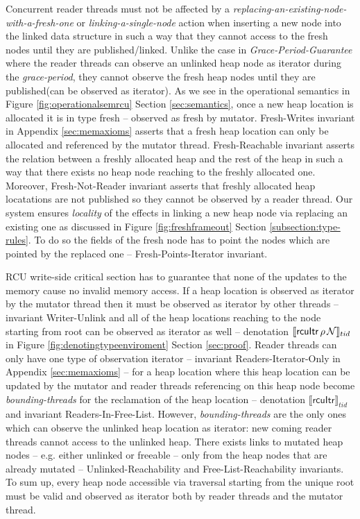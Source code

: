  Concurrent reader threads must not be affected by a \textit{replacing-an-existing-node-with-a-fresh-one} or \textit{linking-a-single-node} action when inserting a new node into the linked data structure in such a way that they cannot access to the fresh nodes until they are published/linked. Unlike the case in \textit{Grace-Period-Guarantee} where the reader threads can observe an unlinked heap node as \textsf{iterator} during the \textit{grace-period}, they cannot observe the fresh heap nodes until they are published(can be observed as \textsf{iterator}). As we see in the operational semantics in Figure \ref{fig:operationalsemrcu} Section \ref{sec:semantics}, once a new heap location is allocated it is in type \textsf{fresh} -- observed as \textsf{fresh} by mutator. \textsf{Fresh-Writes} invariant in Appendix \ref{sec:memaxioms} asserts that a fresh heap location can only be allocated and referenced by the mutator thread. \textsf{Fresh-Reachable} invariant asserts the relation between a freshly allocated heap and the rest of the heap in such a way that there exists no heap node reaching to the freshly allocated one. Moreover, \textsf{Fresh-Not-Reader} invariant asserts that freshly allocated heap locatations are not published so they cannot be observed by a reader thread. Our system ensures \textit{locality} of the effects in linking a new heap node via replacing an existing one as discussed in Figure \ref{fig:freshframeout} Section \ref{subsection:type-rules}. To do so the fields of the fresh node has to point the nodes which are pointed by the replaced one -- \textsf{Fresh-Points-Iterator} invariant.

 RCU write-side critical section has to guarantee that none of the updates to the memory cause no invalid memory access. If a heap location is observed as \textsf{iterator} by the mutator thread then it must be observed as \textsf{iterator} by other threads -- invariant \textsf{Writer-Unlink} and all of the heap locations reaching to the node starting from root can be observed as \textsf{iterator} as well -- denotation $\llbracket \mathsf{rcuItr}\,\rho \,\mathcal{N} \rrbracket_{tid}$ in Figure \ref{fig:denotingtypeenviroment} Section \ref{sec:proof}. Reader threads can only have one type of observation \textsf{iterator} -- invariant \textsf{Readers-Iterator-Only} in Appendix \ref{sec:memaxioms} -- for a heap location where this heap location can be updated by the mutator and reader threads referencing on this heap node become \textit{bounding-threads} for the reclamation of the heap location -- denotation $\llbracket \mathsf{rcuItr} \rrbracket_{tid}$ and invariant \textsf{Readers-In-Free-List}. However, \textit{bounding-threads} are the only ones which can observe the \textsf{unlinked} heap location as \textsf{iterator}: new coming reader threads cannot access to the \textsf{unlinked} heap. There exists links to mutated heap nodes -- e.g. either \textsf{unlinked} or \textsf{freeable} -- only from the heap nodes that are already mutated -- \textsf{Unlinked-Reachability} and \textsf{Free-List-Reachability} invariants. To sum up, every heap node accessible via traversal starting from the unique root must be valid and observed as \textsf{iterator} both by reader threads and the mutator thread.

